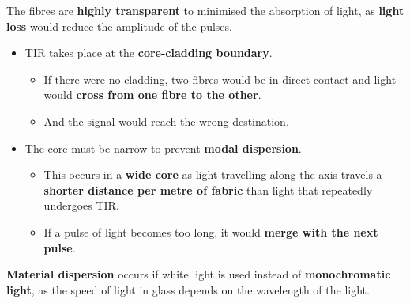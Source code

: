 The fibres are \textbf{highly transparent} to minimised the absorption of light, as \textbf{light loss} would reduce the amplitude of the pulses.
\begin{itemize}
    \item TIR takes place at the \textbf{core-cladding boundary}.
        \begin{itemize}
            \item If there were no cladding, two fibres would be in direct contact and light would \textbf{cross from one fibre to the other}.
            \item And the signal would reach the wrong destination.
        \end{itemize}
    \item The core must be narrow to prevent \textbf{modal dispersion}.
        \begin{itemize}
            \item This occurs in a \textbf{wide core} as light travelling along the axis travels a \textbf{shorter distance per metre of fabric} than light that repeatedly undergoes TIR.
            \item If a pulse of light becomes too long, it would \textbf{merge with the next pulse}.
        \end{itemize}
\end{itemize}

\textbf{Material dispersion} occurs if white light is used instead of \textbf{monochromatic light}, as the speed of light in glass depends on the wavelength of the light.
